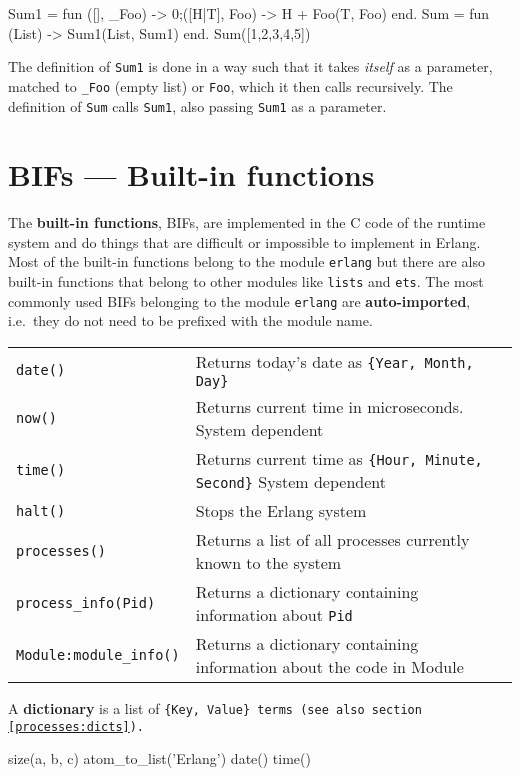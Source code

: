 \begin{erlang}
Sum1 = fun ([], _Foo) -> 0;([H|T], Foo) -> H + Foo(T, Foo) end.
Sum = fun (List) -> Sum1(List, Sum1) end.
Sum([1,2,3,4,5])    %
\end{erlang}

The definition of \texttt{Sum1} is done in a way such that it takes \textit{itself} as a parameter, matched to \texttt{\_Foo} (empty list) or \texttt{Foo},
which it then calls recursively.  The definition of \texttt{Sum} calls \texttt{Sum1}, also passing \texttt{Sum1} as a parameter.

\section{BIFs --- Built-in functions}
\label{functions:bifs}
The \textbf{built-in functions}, BIFs, are implemented in the C code of
the runtime system and do things that are difficult or impossible to
implement in Erlang. Most of the built-in functions belong to the
module \texttt{erlang} but there are also built-in functions that belong
to other modules like \texttt{lists} and \texttt{ets}. The most
commonly used BIFs belonging to the module \texttt{erlang} are
\textbf{auto-imported}, i.e.~they do not need to be prefixed with the
module name.

\begin{center}
\begin{tabular}{|>{\raggedright}p{103pt}|>{\raggedright}p{217pt}|}
\hline
\multicolumn{2}{|p{321pt}|}{Some useful BIFs}\tabularnewline
\hline
\texttt{date()} & Returns today's date as \texttt{\{Year, Month, Day\}}\tabularnewline
\hline
\texttt{now()} & Returns current time in microseconds. System dependent\tabularnewline
\hline
\texttt{time()} & Returns current time as \texttt{\{Hour, Minute, Second\}} System dependent\tabularnewline
\hline
\texttt{halt()} & Stops the Erlang system\tabularnewline
\hline
\texttt{processes()} & Returns a list of all processes currently known to the system\tabularnewline
\hline
\texttt{process\_info(Pid)} & Returns a dictionary containing information about \texttt{Pid}\tabularnewline
\hline
\texttt{Module:module\_info()} & Returns a dictionary containing information about the code
in Module\tabularnewline
\hline
\end{tabular}
\end{center}

A \textbf{dictionary} is a list of \texttt{\{Key, Value\} terms (see
also section \ref{processes:dicts}).}

\begin{erlang}
size({a, b, c})             %
atom_to_list('Erlang')      %
date()                      %
time()                      %
\end{erlang}
